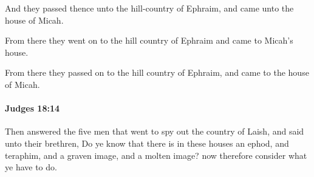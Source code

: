 			\begin{versebox}
					\item[BHS] 
					\item[ASV] And they passed thence unto the hill-country of Ephraim, and came unto the house of Micah.
					\item[NIV] From there they went on to the hill country of Ephraim and came to Micah’s house.
					\item[NRSV] From there they passed on to the hill country of Ephraim, and came to the house of Micah.
			\end{versebox}

		\paragraph{Judges 18:14} %
			\label{JUDGES-18-14}

			Then answered the five men that went to spy out the country of Laish, and said unto their brethren, Do ye know that there is in these houses an ephod, and teraphim, and a graven image, and a molten image? now therefore consider what ye have to do.

